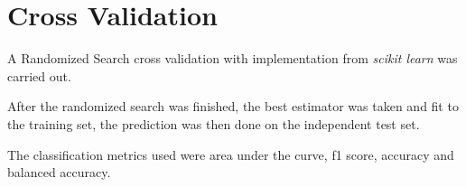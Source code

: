 \documentclass[msthesis.tex]{subfiles}
\begin{document}
\section{Cross Validation}

A Randomized Search cross validation  with implementation from \textit{scikit learn} was carried out. 

After the randomized search was finished, the best estimator was taken and fit to the training set, the prediction was then done on the independent test set.

The classification metrics used were area under the curve, f1 score, accuracy and balanced accuracy.  
\end{document}
